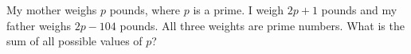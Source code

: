 My mother weighs $p$ pounds, where $p$ is a prime. I weigh $2p+1$ pounds and my father weighs $2p-104$ pounds. All three weights are prime numbers. What is the sum of all possible values of $p$?
